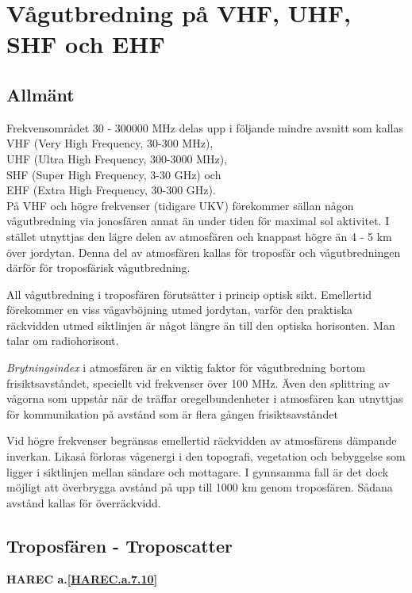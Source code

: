 \section{Vågutbredning på VHF, UHF, SHF och EHF}

\subsection{Allmänt}
Frekvensområdet 30 - 300000 MHz delas upp
i följande mindre avsnitt som kallas \\
VHF (Very High Frequency, 30-300 MHz), \\
UHF (Ultra High Frequency, 300-3000 MHz), \\
SHF (Super High Frequency, 3-30 GHz) och \\
EHF (Extra High Frequency, 30-300 GHz). \\

På VHF och högre frekvenser (tidigare UKV) förekommer sällan någon
vågutbredning via jonosfären annat än under tiden för maximal sol
aktivitet. I stället utnyttjas den lägre delen av atmosfären och
knappast högre än 4 - 5 km över jordytan. Denna del av atmosfären
kallas för troposfär och vågutbredningen därför för troposfärisk
vågutbredning.

All vågutbredning i troposfären förutsätter i princip optisk
sikt. Emellertid förekommer en viss vågavböjning utmed jordytan,
varför den praktiska räckvidden utmed siktlinjen är något längre än
till den optiska horisonten. Man talar om radiohorisont.

\emph{Brytningsindex} i atmosfären är en viktig faktor för
vågutbredning bortom frisiktsavståndet, speciellt vid frekvenser över
100 MHz. Även den splittring av vågorna som uppstår när de träffar
oregelbundenheter i atmosfären kan utnyttjas för kommunikation på
avstånd som är flera gången frisiktsavståndet

Vid högre frekvenser begränsas emellertid räckvidden av atmosfärens
dämpande inverkan. Likaså förloras vågenergi i den topografi,
vegetation och bebyggelse som ligger i siktlinjen mellan sändare och
mottagare. I gynnsamma fall är det dock möjligt att överbrygga avstånd
på upp till 1000 km genom troposfären. Sådana avstånd kallas för
överräckvidd.

\subsection{Troposfären - Troposcatter}
\textbf{
HAREC a.\ref{HAREC.a.7.10}\label{myHAREC.a.7.10}
}

